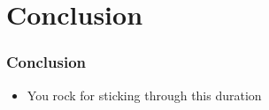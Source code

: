 \documentclass{beamer}
\begin{document}
\section{Conclusion}

\begin{frame}
    \frametitle{Conclusion}
    \begin{itemize}
    \item You rock for sticking through this duration
    \end{itemize}
\end{frame}
\end{document}
